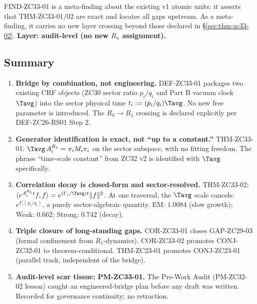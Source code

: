\documentclass[12pt, a4paper]{article}
\begin{document}
\begin{derivedbox}[title={Layer test for FIND-ZC33-01}]
FIND-ZC33-01 is a meta-finding about the existing v1 atomic
units: it asserts that THM-ZC33-01/02 are exact and locates
all gaps upstream. As a meta-finding, it carries no new layer
crossing beyond those declared in §\ref{sec:thm-zc33-02}.
\textbf{Layer: audit-level (no new $R_n$ assignment).}
\end{derivedbox}

\subsection{Summary}
\label{sec:summary}

\begin{enumerate}[leftmargin=*]
\item \textbf{Bridge by combination, not engineering.}
DEF-ZC33-01 packages two existing CRF objects (ZC30
sector ratio $p_i/q_i$ and Part B vacuum clock $\Tavg$)
into the sector physical time $t_i := (p_i/q_i)\Tavg$.
No new free parameter is introduced. The $R_0\to R_1$
crossing is declared explicitly per DEF-ZC26-RS01 Step 2.

\item \textbf{Generator identification is exact, not
``up to a constant.''}
THM-ZC33-01: $\Tavg\,A_i^{R_1} = \pi_i M_i \pi_i$ on the
sector subspace, with no fitting freedom. The phrase
``time-scale constant'' from ZC32 v2 is identified with
$\Tavg$ specifically.

\item \textbf{Correlation decay is closed-form and sector-resolved.}
THM-ZC33-02: $\langle e^{A_i^{R_1} t}f, f\rangle =
e^{(\Gamma_i/\Tavg) t}\|f\|^2$. At one traversal, the
$\Tavg$ scale cancels: $e^{\Gamma_i (p_i/q_i)}$, a purely
sector-algebraic quantity. EM: $1.0084$ (slow growth);
Weak: $0.662$; Strong: $0.742$ (decay).

\item \textbf{Triple closure of long-standing gaps.}
COR-ZC33-01 closes GAP-ZC29-03 (formal confinement from
$R_1$-dynamics). COR-ZC33-02 promotes CONJ-ZC32-01 to
theorem-conditional. THM-ZC23-01 promotes CONJ-ZC23-01
(parallel track, independent of the bridge).

\item \textbf{Audit-level scar tissue: PM-ZC33-01.}
The Pre-Work Audit (PM-ZC32-02 lesson) caught an
engineered-bridge plan before any draft was written.
Recorded for governance continuity; no retraction.


\end{enumerate}
\end{document}
